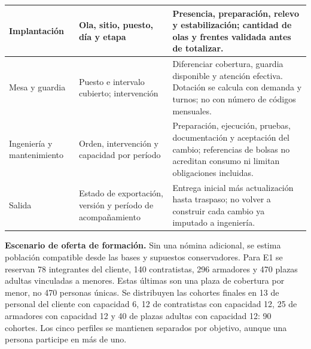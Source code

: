 \begin{longtable}{L{\dimexpr.25\tabcolsep\relax}L{\dimexpr.29\tabcolsep\relax}L{\dimexpr.46\tabcolsep\relax}}
Implantación & Ola, sitio, puesto, día y etapa & Presencia, preparación, relevo y estabilización; cantidad de olas y frentes validada antes de totalizar.\\\hline
Mesa y guardia & Puesto e intervalo cubierto; intervención & Diferenciar cobertura, guardia disponible y atención efectiva. Dotación se calcula con demanda y turnos; no con número de códigos mensuales.\\\hline
Ingeniería y mantenimiento & Orden, intervención y capacidad por período & Preparación, ejecución, pruebas, documentación y aceptación del cambio; referencias de bolsas no acreditan consumo ni limitan obligaciones incluidas.\\\hline
Salida & Estado de exportación, versión y período de acompañamiento & Entrega inicial más actualización hasta traspaso; no volver a construir cada cambio ya imputado a ingeniería.\\\hline
\end{longtable}\endgroup
{}


\textbf{Escenario de oferta de formación.} Sin una nómina adicional, se estima población compatible desde las bases y supuestos conservadores. Para E1 se reservan 78 integrantes del cliente, 140 contratistas, 296 armadores y 470 plazas adultas vinculadas a menores. Estas últimas son una plaza de cobertura por menor, no 470 personas únicas. Se distribuyen las cohortes finales en 13 de personal del cliente con capacidad 6, 12 de contratistas con capacidad 12, 25 de armadores con capacidad 12 y 40 de plazas adultas con capacidad 12: 90 cohortes. Los cinco perfiles se mantienen separados por objetivo, aunque una persona participe en más de uno.

